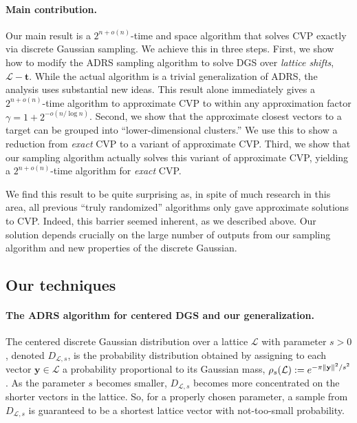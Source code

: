 \documentclass[11pt]{article}
\renewcommand{\vec}[1]{\ensuremath{\mathbf{#1}}}
\newcommand{\problem}[1]{\mbox{#1}\xspace}
\newcommand{\scarequotes}[1]{``#1''}
\newcommand{\lat}{\mathcal{L}}
\DeclarePairedDelimiter\length{\lVert}{\rVert}
\begin{document}
\paragraph{Main contribution. } Our main result is a $2^{n+o(n)}$-time and space algorithm that solves \problem{CVP} exactly via discrete Gaussian sampling. We achieve this in three steps. First, we show how to modify the ADRS sampling algorithm to solve \problem{DGS} over \emph{lattice shifts}, $\lat - \vec{t}$. While the actual algorithm is a trivial generalization of ADRS, the analysis uses substantial new ideas. This result alone immediately gives a $2^{n + o(n)}$-time algorithm to approximate \problem{CVP} to within any approximation factor $\gamma = 1+ 2^{-o(n/\log n)}$.
Second, we show that the approximate closest vectors to a target can be grouped into \scarequotes{lower-dimensional clusters.} We use this to show a reduction from \emph{exact} CVP to a variant of approximate CVP. Third, we show that our sampling algorithm actually solves this variant of approximate CVP, yielding a $2^{n + o(n)}$-time algorithm for \emph{exact} CVP. 

We find this result to be quite surprising as, in spite of much research in this area, all previous \scarequotes{truly randomized} algorithms only gave approximate solutions to \problem{CVP}. Indeed, this barrier seemed inherent, as we described above. Our solution depends crucially on the large number of outputs from our sampling algorithm and new properties of the discrete Gaussian.

\subsection{Our techniques}

\paragraph{The ADRS algorithm for centered \problem{DGS} and our generalization.}
The centered discrete Gaussian distribution over a lattice $\lat$ with parameter $s > 0$, denoted $D_{\lat, s}$, is the probability distribution obtained by assigning to each vector $\vec{y} \in \lat$ a probability proportional to its Gaussian mass, $\rho_s(\lat) := e^{-\pi \length{\vec{y}}^2/s^2}$. As the parameter $s$ becomes smaller, $D_{\lat, s}$ becomes more concentrated on the shorter vectors in the lattice. So, for a properly chosen parameter, a sample from $D_{\lat, s}$ is guaranteed to be a shortest lattice vector with not-too-small probability.
\end{document}

